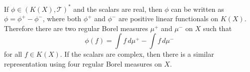 If $\phi \in (K(X), \mathcal{T})^*$ and the scalars are real, then $\phi$ can be written as $\phi = \phi^+ - \phi^-$, where both $\phi^+$ and $\phi^-$ are positive linear functionals on $K(X)$. Therefore there are two regular Borel measures $\mu^+$ and $\mu^-$ on $X$ such that
$$\phi(f) = \int f \, d\mu^+ - \int f \, d\mu^-$$
for all $f \in K(X)$. If the scalars are complex, then there is a similar representation using four regular Borel measures on $X$.

